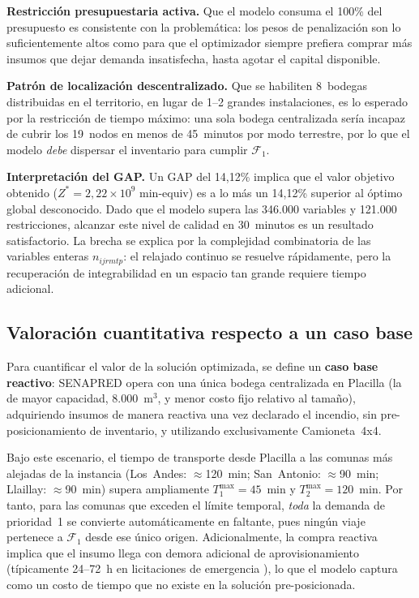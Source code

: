 \documentclass[letterpaper]{article}
\begin{document}
\begin{flushleft}
\textbf{Restricci\'on presupuestaria activa.} Que el modelo consuma el 100\% del presupuesto es consistente con la problem\'atica: los pesos de penalizaci\'on son lo suficientemente altos como para que el optimizador siempre prefiera comprar m\'as insumos que dejar demanda insatisfecha, hasta agotar el capital disponible.

\textbf{Patr\'on de localizaci\'on descentralizado.} Que se habiliten 8~bodegas distribuidas en el territorio, en lugar de 1--2 grandes instalaciones, es lo esperado por la restricci\'on de tiempo m\'aximo: una sola bodega centralizada ser\'ia incapaz de cubrir los 19~nodos en menos de 45~minutos por modo terrestre, por lo que el modelo \emph{debe} dispersar el inventario para cumplir $\mathcal{F}_1$.

\textbf{Interpretaci\'on del GAP.} Un GAP del 14{,}12\% implica que el valor objetivo obtenido ($Z^* = 2{,}22 \times 10^{9}$ min-equiv) es a lo m\'as un 14{,}12\% superior al \'optimo global desconocido. Dado que el modelo supera las 346.000 variables y 121.000 restricciones, alcanzar este nivel de calidad en 30~minutos es un resultado satisfactorio. La brecha se explica por la complejidad combinatoria de las variables enteras $n_{ijrmtp}$: el relajado continuo se resuelve r\'apidamente, pero la recuperaci\'on de integrabilidad en un espacio tan grande requiere tiempo adicional.

\subsection{Valoraci\'on cuantitativa respecto a un caso base}

Para cuantificar el valor de la soluci\'on optimizada, se define un \textbf{caso base reactivo}: SENAPRED opera con una \'unica bodega centralizada en Placilla (la de mayor capacidad, 8.000~m$^3$, y menor costo fijo relativo al tama\~no), adquiriendo insumos de manera reactiva una vez declarado el incendio, sin pre-posicionamiento de inventario, y utilizando exclusivamente Camioneta~4x4.

Bajo este escenario, el tiempo de transporte desde Placilla a las comunas m\'as alejadas de la instancia (Los~Andes: $\approx$120~min; San~Antonio: $\approx$90~min; Llaillay: $\approx$90~min) supera ampliamente $T^{\max}_1=45$~min y $T^{\max}_2=120$~min. Por tanto, para las comunas que exceden el l\'imite temporal, \emph{toda} la demanda de prioridad~1 se convierte autom\'aticamente en faltante, pues ning\'un viaje pertenece a $\mathcal{F}_1$ desde ese \'unico origen. Adicionalmente, la compra reactiva implica que el insumo llega con demora adicional de aprovisionamiento (t\'ipicamente 24--72~h en licitaciones de emergencia \cite{chilecompra2025}), lo que el modelo captura como un costo de tiempo que no existe en la soluci\'on pre-posicionada.


\end{flushleft}
\end{document}
